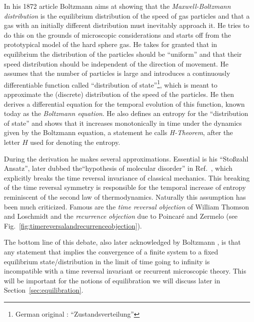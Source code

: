 \documentclass[a4paper,12pt,listof=totoc,index=totoc,bibliography=totoc,headsepline=false,headings=normal,BCOR16.153846mm,DIV12,headinclude,twoside,cleardoublepage=empty,numbers=noenddot,final]{scrreprt}
\theoremstyle{mystyle}
\numberwithin{equation}{section}
\numberwithin{figure}{section}
\numberwithin{lemma}{section}
\numberwithin{theorem}{section}
\numberwithin{corollary}{section}
\numberwithin{definition}{section}
\numberwithin{conjecture}{section}
\numberwithin{observation}{section}
\newcommand{\+}{\mkern2mu}
\DeclareMathOperator{\1}{\mathds{1}}
\begin{document}
In his 1872 article \cite{Boltzmann1872} Boltzmann aims at showing that the \emph{Maxwell-Boltzmann distribution} is the equilibrium distribution of the speed of gas particles and that a gas with an initially different distribution must inevitably approach it.
He tries to do this on the grounds of microscopic considerations and starts off from the prototypical model of the hard sphere gas.
He takes for granted that in equilibrium the distribution of the particles should be ``uniform'' and that their speed distribution should be independent of the direction of movement.
He assumes that the number of particles is large and introduces a continuously differentiable function called ``distribution of state''\footnote{German original \cite{Boltzmann1872}: \foreignlanguage{ngerman}{``Zustandsverteilung''}}, which is meant to approximate the (discrete) distribution of the speed of the particles.
He then derives a differential equation for the temporal evolution of this function, known today as the \emph{Boltzmann equation}.
He also defines an entropy for the ``distribution of state'' and shows that it increases monotonically in time under the dynamics given by the Boltzmann equation, a statement he calls \emph{H-Theorem}, after the letter $H$ used for denoting the entropy.

During the derivation he makes several approximations.
Essential is his ``Stoßzahl Ansatz'', later dubbed the``hypothesis of molecular disorder'' in Ref.~\cite{Boltzmann1896}, which explicitly breaks the time reversal invariance of classical mechanics.
This breaking of the time reversal symmetry is responsible for the  temporal increase of entropy reminiscent of the second law of thermodynamics.
Naturally this assumption has been much criticized.
Famous are the \emph{time reversal objection} of William Thomson and Loschmidt and the \emph{recurrence objection} due to Poincar\'{e} and Zermelo \cite{Sklar1995} (see Fig.~\ref{fig:timereversalandrecurrenceobjection}).

The bottom line of this debate, also later acknowledged by Boltzmann \cite{Boltzmann1896a}, is that any statement that implies the convergence of a finite system to a fixed equilibrium state/distribution in the limit of time going to infinity is incompatible with a time reversal invariant or recurrent microscopic theory.
This will be important for the notions of equilibration we will discuss later in Section~\ref{sec:equilibration}.
\end{document}
